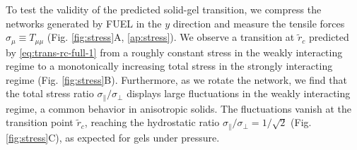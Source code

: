 \documentclass[endfloats,nofootinbib,preprint,floatfix,titlepage,superscriptaddress,linenumbers]{revtex4-1} %
\begin{document}
To test the validity of the predicted solid-gel transition,
we compress the networks generated by FUEL in the $y$ direction and measure the tensile forces 
$ \sigma_\mu \equiv T_{\mu\mu}$ (Fig. \ref{fig:stress}A, \ref{ap:stress}).
We observe a transition at $\tilde{r}_c$ predicted by \eqref{eq:trans-rc-full-1} from a roughly constant stress in the weakly interacting regime to a monotonically increasing total stress in the strongly interacting regime (Fig. \ref{fig:stress}B). 
Furthermore, as we rotate the network, we
find that the total stress ratio $ \sigma_\parallel/ \sigma_\perp$ displays large fluctuations in the weakly interacting regime, a common behavior in anisotropic solids. 
The fluctuations vanish at the transition point $\tilde{r}_c$, reaching the hydrostatic ratio $\sigma_\parallel/\sigma_\perp = 1/\sqrt{2}$  (Fig. \ref{fig:stress}C), as expected for gels under pressure. 
\end{document}
